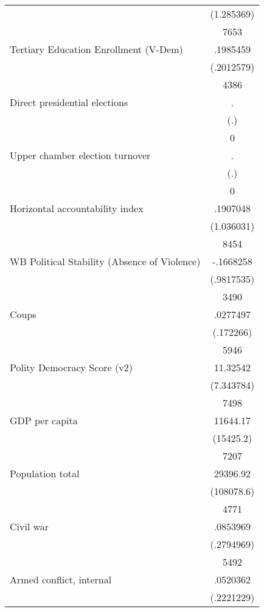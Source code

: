 {\begin{longtable}{l*{1}{c}}
                    &  (1.285369)\\
                    &        7653\\
Tertiary Education Enrollment (V-Dem)&    .1985459\\
                    &  (.2012579)\\
                    &        4386\\
Direct presidential elections&           .\\
                    &         (.)\\
                    &           0\\
Upper chamber election turnover&           .\\
                    &         (.)\\
                    &           0\\
Horizontal accountability index&    .1907048\\
                    &  (1.036031)\\
                    &        8454\\
WB Political Stability (Absence of Violence)&   -.1668258\\
                    &  (.9817535)\\
                    &        3490\\
Coups               &    .0277497\\
                    &   (.172266)\\
                    &        5946\\
Polity Democracy Score (v2)&    11.32542\\
                    &  (7.343784)\\
                    &        7498\\
GDP per capita      &    11644.17\\
                    &   (15425.2)\\
                    &        7207\\
Population total    &    29396.92\\
                    &  (108078.6)\\
                    &        4771\\
Civil war           &    .0853969\\
                    &  (.2794969)\\
                    &        5492\\
Armed conflict, internal&    .0520362\\
                    &  (.2221229)\\

\end{longtable}}
